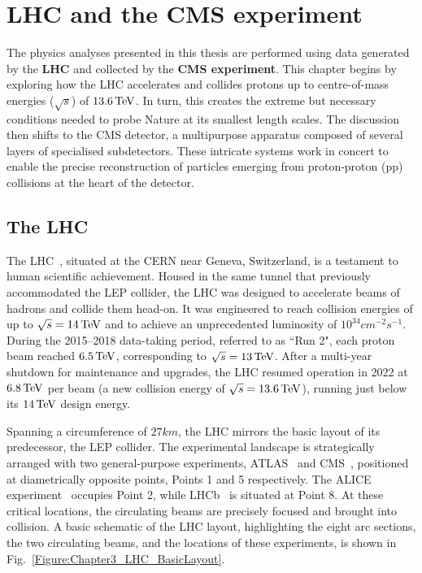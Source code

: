 \chapter{LHC and the CMS experiment}
\thispagestyle{plain}  %
\pagestyle{chapterpages}
\label{Section:Chapter3}

\minitoc

The physics analyses presented in this thesis are performed using data generated by the \textbf{\ac{LHC}} and collected by the \textbf{\ac{CMS} experiment}. This chapter begins by exploring how the \ac{LHC} accelerates and collides protons up to centre-of-mass energies ($\sqrt{s}$) of $13.6\,\text{Te\hspace{-.08em}V}$. In turn, this creates the extreme but necessary conditions needed to probe Nature at its smallest length scales. The discussion then shifts to the \ac{CMS} detector, a multipurpose apparatus composed of several layers of specialised subdetectors. These intricate systems work in concert to enable the precise reconstruction of particles emerging from proton-proton (pp) collisions at the heart of the detector.

\section{The LHC}
\label{Section:Chapter3_LHC}
The \ac{LHC}~\cite{LHC_1}, situated at the \ac{CERN} near Geneva, Switzerland, is a testament to human scientific achievement. Housed in the same tunnel that previously accommodated the \ac{LEP} collider, the \ac{LHC} was designed to accelerate beams of hadrons and collide them head-on. It was engineered to reach collision energies of up to $\sqrt{s} = 14\,\text{Te\hspace{-.08em}V}$ and to achieve an unprecedented luminosity of $10^{34}\unit{cm}^{-2}\unit{s}^{-1}$. During the 2015–2018 data-taking period, referred to as ``Run 2", each proton beam reached $6.5\,\text{Te\hspace{-.08em}V}$, corresponding to $\sqrt{s}=13\,\text{Te\hspace{-.08em}V}$. After a multi-year shutdown for maintenance and upgrades, the \ac{LHC} resumed operation in 2022 at $6.8\,\text{Te\hspace{-.08em}V}$ per beam (a new collision energy of $\sqrt{s}=13.6\,\text{Te\hspace{-.08em}V}$), running just below its $14\,\text{Te\hspace{-.08em}V}$ design energy. 

Spanning a circumference of $27\unit{km}$, the \ac{LHC} mirrors the basic layout of its predecessor, the \ac{LEP} collider. The experimental landscape is strategically arranged with two general-purpose experiments, ATLAS~\cite{LHC_ATLAS} and \ac{CMS}~\cite{LHC_CMS}, positioned at diametrically opposite points, Points 1 and 5 respectively. The ALICE experiment~\cite{LHC_ALICE} occupies Point 2, while LHCb~\cite{LHC_LCHb} is situated at Point 8. At these critical locations, the circulating beams are precisely focused and brought into collision. A basic schematic of the \ac{LHC} layout, highlighting the eight arc sections, the two circulating beams, and the locations of these experiments, is shown in Fig.~\ref{Figure:Chapter3_LHC_BasicLayout}.

